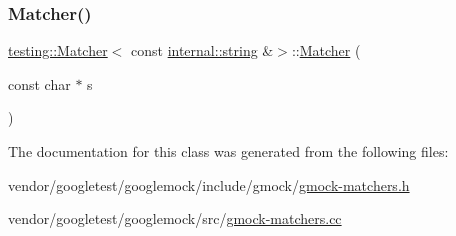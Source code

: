 \mbox{\label{classtesting_1_1_matcher_3_01const_01internal_1_1string_01_6_4_accc8b69db530a019efa2a1d6436eb3db}} 
\subsubsection{\texorpdfstring{Matcher()}{Matcher()}\hspace{0.1cm}{\footnotesize\ttfamily [4/4]}}
{\footnotesize\ttfamily \hyperlink{classtesting_1_1_matcher}{testing\+::\+Matcher}$<$ const \hyperlink{namespacetesting_1_1internal_a8e8ff5b11e64078831112677156cb111}{internal\+::string} \&$>$\+::\hyperlink{classtesting_1_1_matcher}{Matcher} (\begin{DoxyParamCaption}\item[{const char $\ast$}]{s }\end{DoxyParamCaption})}



The documentation for this class was generated from the following files\+:\begin{DoxyCompactItemize}
\item 
vendor/googletest/googlemock/include/gmock/\hyperlink{gmock-matchers_8h}{gmock-\/matchers.\+h}\item 
vendor/googletest/googlemock/src/\hyperlink{gmock-matchers_8cc}{gmock-\/matchers.\+cc}\end{DoxyCompactItemize}
